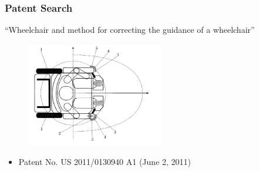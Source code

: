 \documentclass{beamer}
\begin{document}
\begin{frame}
  \frametitle{Patent Search}
  ``Wheelchair and method for correcting the guidance of a wheelchair''
  \begin{figure}
    \centering
    \includegraphics[width=6cm]{patents3.png}
  \end{figure}
  \begin{itemize}
    \item Patent No. US 2011/0130940 A1 (June 2, 2011) \\
  \end{itemize}
\end{frame}
\end{document}

